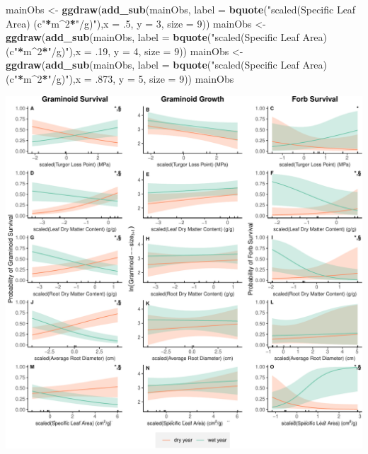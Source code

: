 \documentclass[
]{article}
\newenvironment{Shaded}{\begin{snugshade}}{\end{snugshade}}
\newcommand{\DataTypeTok}[1]{\textcolor[rgb]{0.13,0.29,0.53}{#1}}
\newcommand{\DecValTok}[1]{\textcolor[rgb]{0.00,0.00,0.81}{#1}}
\newcommand{\FloatTok}[1]{\textcolor[rgb]{0.00,0.00,0.81}{#1}}
\newcommand{\KeywordTok}[1]{\textcolor[rgb]{0.13,0.29,0.53}{\textbf{#1}}}
\newcommand{\NormalTok}[1]{#1}
\newcommand{\OperatorTok}[1]{\textcolor[rgb]{0.81,0.36,0.00}{\textbf{#1}}}
\newcommand{\StringTok}[1]{\textcolor[rgb]{0.31,0.60,0.02}{#1}}
\begin{document}
\begin{Shaded}
\begin{Highlighting}[]
\NormalTok{mainObs \textless{}{-}}\StringTok{ }\KeywordTok{ggdraw}\NormalTok{(}\KeywordTok{add\_sub}\NormalTok{(mainObs, }\DataTypeTok{label =} \KeywordTok{bquote}\NormalTok{(}\StringTok{"scaled(Specific Leaf Area) (c"}\OperatorTok{*}\NormalTok{m}\OperatorTok{\^{}}\DecValTok{2}\OperatorTok{*}\StringTok{"/g)"}\NormalTok{),}\DataTypeTok{x =} \FloatTok{.5}\NormalTok{, }\DataTypeTok{y =} \DecValTok{3}\NormalTok{, }\DataTypeTok{size =} \DecValTok{9}\NormalTok{))}
\NormalTok{mainObs \textless{}{-}}\StringTok{ }\KeywordTok{ggdraw}\NormalTok{(}\KeywordTok{add\_sub}\NormalTok{(mainObs, }\DataTypeTok{label =} \KeywordTok{bquote}\NormalTok{(}\StringTok{"scaled(Specific Leaf Area) (c"}\OperatorTok{*}\NormalTok{m}\OperatorTok{\^{}}\DecValTok{2}\OperatorTok{*}\StringTok{"/g)"}\NormalTok{),}\DataTypeTok{x =} \FloatTok{.19}\NormalTok{, }\DataTypeTok{y =} \DecValTok{4}\NormalTok{, }\DataTypeTok{size =} \DecValTok{9}\NormalTok{))}
\NormalTok{mainObs \textless{}{-}}\StringTok{ }\KeywordTok{ggdraw}\NormalTok{(}\KeywordTok{add\_sub}\NormalTok{(mainObs, }\DataTypeTok{label =} \KeywordTok{bquote}\NormalTok{(}\StringTok{"scaled(Specific Leaf Area) (c"}\OperatorTok{*}\NormalTok{m}\OperatorTok{\^{}}\DecValTok{2}\OperatorTok{*}\StringTok{"/g)"}\NormalTok{),}\DataTypeTok{x =} \FloatTok{.873}\NormalTok{, }\DataTypeTok{y =} \DecValTok{5}\NormalTok{, }\DataTypeTok{size =} \DecValTok{9}\NormalTok{))}
\NormalTok{mainObs}
\end{Highlighting}
\end{Shaded}

\includegraphics{figures/mainObservationsFig-1.pdf}
\end{document}
